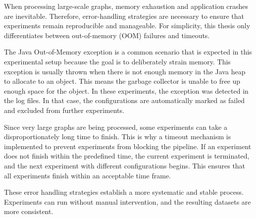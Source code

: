 When processing large-scale graphs, memory exhaustion and application crashes are inevitable. Therefore, error-handling strategies are necessary to ensure that experiments remain reproducible and manageable. For simplicity, this thesis only differentiates between out-of-memory (OOM) failures and timeouts. \par
The Java Out-of-Memory exception is a common scenario that is expected in this experimental setup because the goal is to deliberately strain memory. This exception is usually thrown when there is not enough memory in the Java heap to allocate to an object. This means the garbage collector is unable to free up enough space for the object. In these experiments, the exception was detected in the log files. In that case, the configurations are automatically marked as failed and excluded from further experiments. \par
Since very large graphs are being processed, some experiments can take a disproportionately long time to finish. This is why a timeout mechanism is implemented to prevent experiments from blocking the pipeline. If an experiment does not finish within the predefined time, the current experiment is terminated, and the next experiment with different configurations begins. This ensures that all experiments finish within an acceptable time frame.  \par
These error handling strategies establish a more systematic and stable process. Experiments can run without manual intervention, and the resulting datasets are more consistent.

